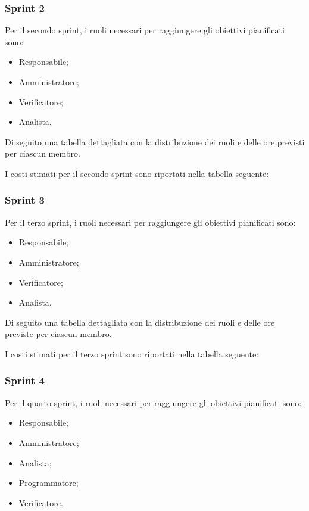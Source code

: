 



\subsubsection{Sprint 2}
Per il secondo sprint, i ruoli necessari per raggiungere gli obiettivi
pianificati sono:
\begin{itemize}
    \item Responsabile;
    \item Amministratore;
    \item Verificatore;
    \item Analista.
\end{itemize}

\newpage
Di seguito una tabella dettagliata con la distribuzione dei ruoli e delle ore previsti per ciascun membro.




I costi stimati per il secondo sprint sono riportati nella tabella seguente:





\subsubsection{Sprint 3}
Per il terzo sprint, i ruoli necessari per raggiungere gli obiettivi
pianificati sono:
\begin{itemize}
    \item Responsabile;
    \item Amministratore;
    \item Verificatore;
    \item Analista.
\end{itemize}

\newpage
Di seguito una tabella dettagliata con la distribuzione dei ruoli e delle ore previste per ciascun membro.



I costi stimati per il terzo sprint sono riportati nella tabella seguente:



\subsubsection{Sprint 4}
Per il quarto sprint, i ruoli necessari per raggiungere gli obiettivi pianificati sono:
\begin{itemize}
    \item Responsabile;
    \item Amministratore;
    \item Analista;
    \item Programmatore;
    \item Verificatore.
\end{itemize}

